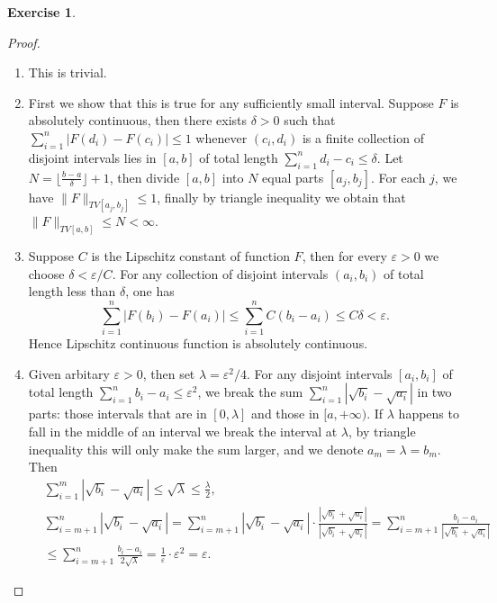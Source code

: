 \documentclass[a4paper]{article}
\newtheorem{ex}{Exercise}[subsection]
\begin{document}
\begin{ex}\end{ex}\begin{proof}\ \begin{enumerate}[label = (\roman*)]
    \item This is trivial.
    \item First we show that this is true for any sufficiently small interval. Suppose $F$ is absolutely continuous,
    then there exists $\delta > 0$ such that $\sum_{i = 1}^n |F(d_i) - F(c_i)| \leq 1$ whenever $(c_i, d_i)$ is a 
    finite collection of disjoint intervals lies in $[a, b]$ of total length $\sum_{i = 1}^n d_i - c_i \leq \delta$.
    Let $N = \lfloor \frac{b - a}{\delta}\rfloor + 1$, then divide $[a, b]$ into $N$ equal parts $[a_j, b_j]$.
    For each $j$, we have $\|F\|_{TV[a_j, b_j]}\leq 1$, finally by triangle inequality we obtain that 
    $\|F\|_{TV[a, b]} \leq N < \infty$.
    \item Suppose $C$ is the Lipschitz constant of function $F$, then for every $\varepsilon > 0$ we choose 
    $\delta < \varepsilon / C$. For any collection of disjoint intervals $(a_i, b_i)$ of total length less than $\delta$,
    one has $$
    \sum_{i = 1}^n |F(b_i) - F(a_i)| \leq \sum_{i = 1}^n C(b_i - a_i) \leq C\delta < \varepsilon.
    $$Hence Lipschitz continuous function is absolutely continuous.
    \item Given arbitary $\varepsilon > 0$, then set $\lambda = \varepsilon^2/4$. For any disjoint intervals $[a_i, b_i]$
    of total length $\sum_{i = 1}^n b_i - a_i \leq \varepsilon^2$, we break the sum $\sum_{i = 1}^n |\sqrt{b_i} - \sqrt{a_i}|$
    in two parts: those intervals that are in $[0, \lambda]$ and those in $[a, +\infty)$. If $\lambda$ happens to fall in the 
    middle of an interval we break the interval at $\lambda$, by triangle inequality this will only make the sum larger,
    and we denote $a_m = \lambda = b_m$. Then \begin{align*}
    &\sum_{i = 1}^m |\sqrt{b_i} - \sqrt{a_i}| \leq \sqrt{\lambda} \leq \frac{\lambda}{2},\\
    &\sum_{i = m + 1}^n |\sqrt{b_i} - \sqrt{a_i}| = \sum_{i = m + 1}^n |\sqrt{b_i} - \sqrt{a_i}|\cdot 
    \frac{|\sqrt{b_i} + \sqrt{a_i}|}{|\sqrt{b_i} + \sqrt{a_i}|} = \sum_{i = m + 1}^n\frac{b_i - a_i}{|\sqrt{b_i} + \sqrt{a_i}|}\\
    &\leq \sum_{i = m + 1}^n \frac{b_i - a_i}{2\sqrt{\lambda}} = \frac{1}{\varepsilon}\cdot \varepsilon^2 = \varepsilon.
    \end{align*}

\end{enumerate}
\end{proof}
\end{document}
